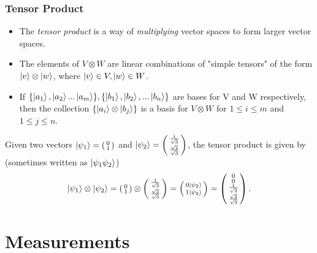 \documentclass[handout, 10 pt]{beamer}
\newcommand{\icol}[1]{%
  \left(\begin{smallmatrix}#1\end{smallmatrix}\right)%
}
\begin{document}
\begin{frame}
\frametitle{Tensor Product}
\begin{itemize}
    \item The \textit{tensor product} is a way of {\emph{multiplying}} vector spaces to form larger vector spaces. 
    \pause
    \item The elements of $V \otimes W$ are linear combinations of "simple tensors" of the form $\ket{v} \otimes \ket{w}$, where $\ket{v} \in V, \ket{w} \in W$. 
    \pause
    \item If $\{\ket{a_1}, \ket{a_2}...\ket{a_m}\}, \{\ket{b_1},\ket{b_2}, ...\ket{b_n}\}$ are bases for V and W respectively, then the collection $\{\ket{a_i}\otimes\ket{b_j}\}$ is a basis for $V \otimes W$ for $1\leq i \leq m$ and $1 \leq j \leq n$.
\end{itemize}
\pause
\begin{example}

Given two vectors $\ket{\psi_1}=\icol{0\\1}$ and $\ket{\psi_2}=\icol{\frac{1}{\sqrt{3}}\\\frac{\sqrt{2}}{\sqrt{3}}}$, the tensor product is given by (sometimes written as $\ket{\psi_1 \psi_2}$)
\begin{equation}
\ket{\psi_1} \otimes\ket{\psi_2}
= \icol{0\\1} \otimes \icol{\frac{1}{\sqrt{3}}\\\frac{\sqrt{2}}{\sqrt{3}}} = \icol{ 0\ket{\psi_2} \\ 1\ket{\psi_2}}=\icol{0\\0\\\frac{1}{\sqrt{3}}\\\frac{\sqrt{2}}{\sqrt{3}}}.
\end{equation}
\end{example}
\end{frame}

\section{Measurements}
\begin{comment}
The postulates of quantum mechanics were derived from a long process of trial and error and establish a mathematical framework for the development of physical theories.
Note the following description is not mathematically rigorous.
\end{comment}
\end{document}
